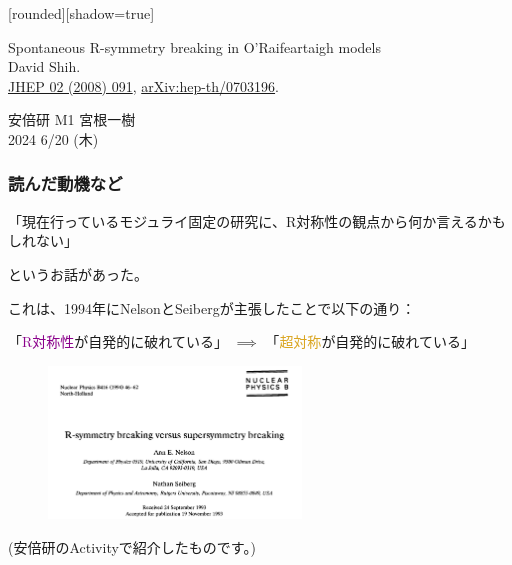 \documentclass[
  unicode,a4paper,9pt,
  xcolor = {dvipsnames,svgnames},
  hyperref ={colorlinks=true,citecolor=Navy,linkcolor=NavyBlue,urlcolor=purple},
  ja=standard,lualatex
]{beamer}
\begin{document}
\begin{frame}

  [rounded][shadow=true]
  \begin{block}{}
    \vspace*{5pt}

    \centering\Large
    Spontaneous R-symmetry breaking in O'Raifeartaigh models
    \\
    \normalsize
    David Shih.
    \\
    \small
    \href{https://doi.org/10.1088/1126-6708/2008/02/091}{JHEP 02 (2008) 091},
    \href{https://arxiv.org/abs/hep-th/0703196}{arXiv:hep-th/0703196}.

    \vspace*{5pt}
  \end{block}

  \vspace*{1cm}

  \begin{center}
    安倍研 M1 宮根一樹\\
    2024 6/20 (木)
  \end{center}

\end{frame}

\nocite{Shih:2007av}

\begin{frame}
  \frametitle{読んだ動機など}

  \begin{center}
    「現在行っているモジュライ固定の研究に、R対称性の観点から何か言えるかもしれない」
  \end{center}
  というお話があった。

  これは、1994年にNelsonとSeibergが主張したこと\cite{Nelson:1993nf}で以下の通り：
  \begin{center}
    「\textcolor{DarkMagenta}{R対称性}が自発的に破れている」
    $\implies$
    「\textcolor{Goldenrod}{超対称}が自発的に破れている」
  \end{center}

  \begin{figure}
    \centering
    \includegraphics[width=0.6\textwidth]{fig/Nelson1993nf.PNG}
  \end{figure}

  \begin{center}
    (安倍研のActivityで紹介したものです。)
  \end{center}

\end{frame}
\end{document}
